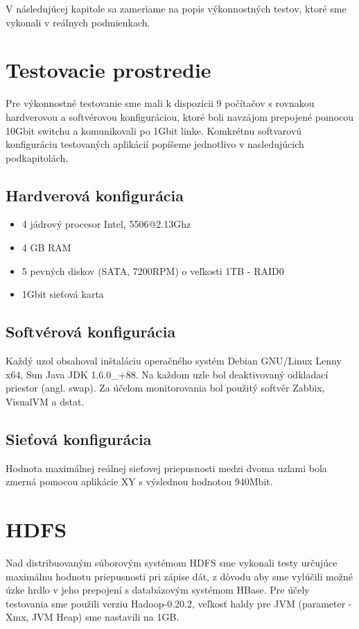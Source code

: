 \documentclass[11pt,twoside,a4paper]{book}
\begin{document}
V následujúcej kapitole sa zameriame na popis výkonnostných testov, ktoré sme vykonali v reálnych podmienkach.


\section{Testovacie prostredie}

Pre výkonnostné testovanie sme mali k dispozícii 9 počítačov s rovnakou hardverovou a softvérovou konfiguráciou, ktoré boli navzájom prepojené pomocou 10Gbit switchu a komunikovali po 1Gbit linke. Komkrétnu softvarovú konfiguráciu testovaných aplikácií popíšeme jednotlivo v nasledujúcich podkapitolách.

\subsection*{Hardverová konfigurácia}
\begin{itemize}
 \item 4 jádrový procesor Intel, 5506@2.13Ghz
 \item 4 GB RAM
 \item 5 pevných diskov (SATA, 7200RPM) o veľkosti 1TB - RAID0
 \item 1Gbit sieťová karta
\end{itemize}

\subsection*{Softvérová konfigurácia} 
Každý uzol obsahoval inštaláciu operačného systém Debian GNU/Linux Lenny x64, Sun Java JDK 1.6.0\_+88. Na každom uzle bol deaktivovaný odkladací priestor (angl. swap). Za účelom monitorovania bol použitý softvér Zabbix, VisualVM a dstat.

\subsection*{Sieťová konfigurácia}

Hodnota maximálnej reálnej sieťovej priepusnosti medzi dvoma uzlami bola zmerná pomocou aplikácie XY s výslednou hodnotou 940Mbit.

\section{HDFS}
Nad distribuovaným súborovým systémom HDFS sme vykonali testy určujúce maximálnu hodnotu priepusnosti pri zápise dát, z dôvodu aby sme vylúčili možné úzke hrdlo v jeho prepojení s databázovým systémom HBase. Pre účely testovania sme použili verziu Hadoop-0.20.2, veľkosť haldy pre JVM (parameter -Xmx, JVM Heap) sme nastavili na 1GB.
\end{document}
